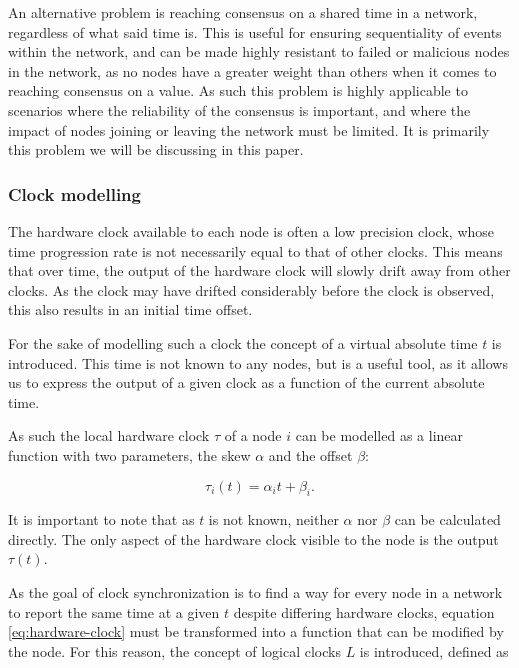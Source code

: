 \documentclass[a4paper,12pt]{article}
\begin{document}
An alternative problem is reaching consensus on a shared time in a network, regardless of what said time is. This is useful for ensuring sequentiality of events within the network, and can be made highly resistant to failed or malicious nodes in the network, as no nodes have a greater weight than others when it comes to reaching consensus on a value. As such this problem is highly applicable to scenarios where the reliability of the consensus is important, and where the impact of nodes joining or leaving the network must be limited. It is primarily this problem we will be discussing in this paper.

\subsubsection{Clock modelling}

The hardware clock available to each node is often a low precision clock, whose time progression rate is not necessarily equal to that of other clocks. This means that over time, the output of the hardware clock will slowly drift away from other clocks. As the clock may have drifted considerably before the clock is observed, this also results in an initial time offset.

For the sake of modelling such a clock the concept of a virtual absolute time $t$ is introduced. This time is not known to any nodes, but is a useful tool, as it allows us to express the output of a given clock as a function of the current absolute time.

As such the local hardware clock $\tau$ of a node $i$ can be modelled as a linear function with two parameters, the skew $\alpha$ and the offset $\beta$:


\begin{equation}\label{eq:hardware-clock}
    \tau_i(t) = \alpha_i t + \beta_i.
\end{equation}

It is important to note that as $t$ is not known, neither $\alpha$ nor $\beta$ can be calculated directly. The only aspect of the hardware clock visible to the node is the output $\tau(t)$.

As the goal of clock synchronization is to find a way for every node in a network to report the same time at a given $t$ despite differing hardware clocks, equation \ref{eq:hardware-clock} must be transformed into a function that can be modified by the node. For this reason, the concept of logical clocks $L$ is introduced, defined as
\end{document}
